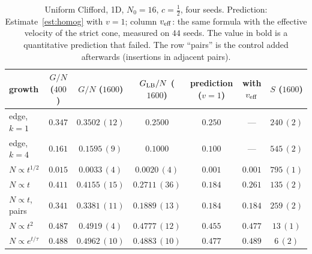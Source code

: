 \begin{table}[h]
\centering\small
\begin{tabular}{lcccccc}
\toprule
growth & $G/N$ ($400$) & $G/N$ ($1600$) & $G_{\rm LB}/N$ ($1600$) & prediction ($v=1$) & with $v_{\rm eff}$ & $S$ ($1600$) \\
\midrule
edge, $k=1$ & $0.347$ & $0.3502\,(12)$ & $0.2500$ & $0.250$ & --- & $240\,(2)$ \\
edge, $k=4$ & $0.161$ & $0.1595\,(9)$ & $0.1000$ & $0.100$ & --- & $545\,(2)$ \\
$N\propto t^{1/2}$ & $0.015$ & $0.0033\,(4)$ & $0.0020\,(4)$ & $0.001$ & $0.001$ & $795\,(1)$ \\
$N\propto t$ & $0.411$ & $0.4155\,(15)$ & $0.2711\,(36)$ & $\mathbf{0.184}$ & $0.261$ & $135\,(2)$ \\
$N\propto t$, pairs & $0.341$ & $0.3381\,(11)$ & $0.1889\,(13)$ & $0.184$ & $0.184$ & $259\,(2)$ \\
$N\propto t^2$ & $0.487$ & $0.4919\,(4)$ & $0.4777\,(12)$ & $0.455$ & $0.477$ & $13\,(1)$ \\
$N\propto e^{t/\tau}$ & $0.488$ & $0.4962\,(10)$ & $0.4883\,(10)$ & $0.477$ & $0.489$ & $6\,(2)$ \\
\bottomrule
\end{tabular}
\caption{Uniform Clifford, 1D, $N_0=16$, $c=\frac12$, four seeds. Prediction: Estimate~\ref{est:homog} with $v=1$; column $v_{\rm eff}$: the same formula with the effective velocity of the strict cone, measured on $44$ seeds. The value in bold is a quantitative prediction that failed. The row ``pairs'' is the control added afterwards (insertions in adjacent pairs).}
\label{tab:1d}
\end{table}

